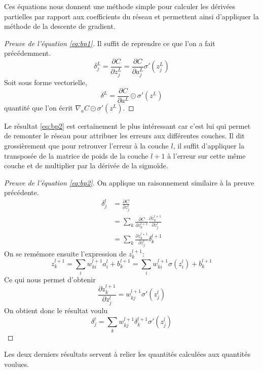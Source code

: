 Ces équations nous donnent une méthode simple pour calculer les dérivées partielles 
par rapport aux coefficients du réseau et permettent ainsi d'appliquer la méthode 
de la descente de gradient.

\begin{proof}[Preuve de l'équation \ref{eq:bp1}]
Il suffit de reprendre ce que l'on a fait précédemment. 
\[
\delta_{j}^{L} = \frac{\partial C}{\partial z_{j}^{L}} = \frac{\partial C}{\partial a_{j}^{L}} \sigma'(z_{j}^{L})
\]
Soit sous forme vectorielle,
\[
\delta^{L} = \frac{\partial C}{\partial a^{L}} \odot \sigma'(z^{L})
\]
quantité que l'on écrit $\nabla_{a} C \odot \sigma'(z^{L})$.
\end{proof}

\vspace{1em}

Le résultat \ref{eq:bp2} est certainement le plus intéressant car c'est lui qui permet 
de remonter le réseau pour attribuer les erreurs aux différentes couches. 
Il dit grossièrement que pour retrouver l'erreur à la couche $l$, il suffit 
d'appliquer la transposée de la matrice de poids de la couche $l+1$ à l'erreur 
sur cette même couche et de multiplier par la dérivée de la sigmoïde.

\begin{proof}[Preuve de l'équation \ref{eq:bp2}]
On applique un raisonnement similaire à la preuve précédente.
\begin{align}
  \delta_{j}^{l} &= \frac{\partial C}{\partial z_{j}^{l}} \\
                 &= \sum_{k} \frac{\partial C}{\partial z_{k}^{l+1}} \frac{\partial z_{k}^{l+1}}{\partial z_{j}^{l}} \\
				 &= \sum_{k} \frac{\partial z_{k}^{l+1}}{\partial z_{j}^{l}} \delta_{k}^{l+1}
\end{align}
On se remémore ensuite l'expression de $z_{k}^{l+1}$:
\[
z_{k}^{l+1} = \sum_{i} w_{ki}^{l+1} a_{i}^{l} + b_{k}^{l+1} = \sum_{i} w_{ki}^{l+1} \sigma(z_{i}^{l}) + b_{k}^{l+1}
\]
Ce qui nous permet d'obtenir
\[
\frac{\partial z_{k}^{l+1}}{\partial z_{j}^{l}} = w_{kj}^{l+1} \sigma'(z_{j}^{l})
\]
On obtient donc le résultat voulu
\[
\delta_{j}^{l} = \sum_{k} w_{kj}^{l+1} \delta_{k}^{l+1} \sigma'(z_{j}^{l})
\]
\end{proof}

\vspace{1em}

Les deux derniers résultats servent à relier les quantités calculées aux 
quantités voulues.

